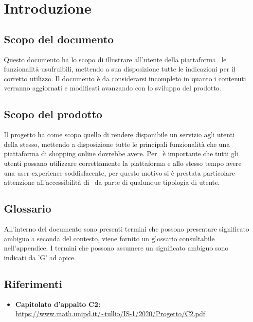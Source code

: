 \section{Introduzione}
\label{Introduzione}
\subsection{Scopo del documento}
Questo documento ha lo scopo di illustrare all'utente della piattaforma \NomeProgetto\ le funzionalità usufruibili, mettendo a sua disposizione tutte le indicazioni per il corretto utilizzo. Il documento è da considerarsi incompleto in quanto i contenuti verranno aggiornati e modificati avanzando con lo sviluppo del prodotto.
\subsection{Scopo del prodotto} 
Il progetto {\NomeProgetto} ha come scopo quello di rendere disponibile un servizio  agli utenti della stesso, mettendo a disposizione tutte le principali funzionalità che una piattaforma di shopping online dovrebbe avere. 
Per \Gruppo\ è importante che tutti gli utenti possano utilizzare correttamente la piattaforma e allo stesso tempo avere una user experience soddisfacente, per questo motivo si è prestata particolare attenzione all'accessibilità di \NomeProgetto\ da parte di qualunque tipologia di utente.
\subsection{Glossario}
All'interno del documento sono presenti termini che possono presentare significato ambiguo a seconda del contesto, viene fornito un glossario consultabile nell'appendice. I termini che possono assumere un significato ambiguo sono indicati da 'G' ad apice. 
\subsection{Riferimenti}
\begin{itemize}
	\item \textbf{Capitolato d'appalto C2:}\\
	\url{https://www.math.unipd.it/~tullio/IS-1/2020/Progetto/C2.pdf}
\end{itemize}